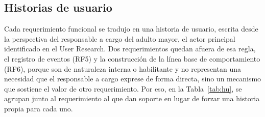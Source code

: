 \subsection{Historias de usuario}

Cada requerimiento funcional se tradujo en una historia de usuario, escrita desde la perspectiva del responsable a cargo del adulto mayor, el actor principal identificado en el User Research.
Dos requerimientos quedan afuera de esa regla, el registro de eventos (RF5) y la construcción de la línea base de comportamiento (RF6), porque son de naturaleza interna o habilitante y no representan una necesidad que el responsable a cargo exprese de forma directa, sino un mecanismo que sostiene el valor de otro requerimiento.
Por eso, en la Tabla~\ref{tab:hu}, se agrupan junto al requerimiento al que dan soporte en lugar de forzar una historia propia para cada uno.

